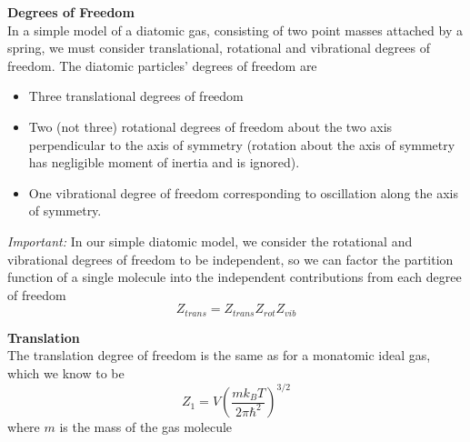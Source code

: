 \documentclass[11pt, a4paper]{article}
\begin{document}
\smallskip
\textbf{Degrees of Freedom}\\
In a simple model of a diatomic gas, consisting of two point masses attached by a spring, we must consider translational, rotational and vibrational degrees of freedom. The diatomic particles' degrees of freedom are
\begin{itemize}
	\item Three translational degrees of freedom
	\item Two (not three) rotational degrees of freedom about the two axis perpendicular to the axis of symmetry (rotation about the axis of symmetry has negligible moment of inertia and is ignored).
	\item One vibrational degree of freedom corresponding to oscillation along the axis of symmetry.
\end{itemize}
\textit{Important:} In our simple diatomic model, we consider the rotational and vibrational degrees of freedom to be independent, so we can factor the partition function of a single molecule into the independent contributions from each degree of freedom
\begin{equation*}
	Z_{trans} = Z_{trans}Z_{rot}Z_{vib}
\end{equation*}

\textbf{Translation}\\
The translation degree of freedom is the same as for a monatomic ideal gas, which we know to be
\begin{equation*}
	Z_{1} = V \left(\frac{mk_{B}T}{2\pi \hbar^{2}}\right)^{3/2}
\end{equation*}
where $ m $ is the mass of the gas molecule
\end{document}
